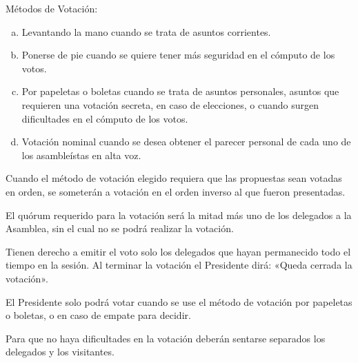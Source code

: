 \article
Métodos de Votación:
\begin{enumerate}[a)]
    \item Levantando la mano cuando se trata de asuntos corrientes.
    \item Ponerse de pie cuando se quiere tener más seguridad en el cómputo de los votos.
    \item Por papeletas o boletas cuando se trata de asuntos personales, asuntos que requieren una votación secreta, en caso de elecciones, o cuando surgen dificultades en el cómputo de los votos.
    \item Votación nominal cuando se desea obtener el parecer personal de cada uno de los asambleístas en alta voz.
\end{enumerate}
Cuando el método de votación elegido requiera que las propuestas sean votadas en orden, se someterán a votación en el orden inverso al que fueron presentadas.

\article
El quórum requerido para la votación será la mitad más uno de los delegados a la Asamblea, sin el cual no se podrá realizar la votación.

\article
Tienen derecho a emitir el voto solo los delegados que hayan permanecido todo el tiempo en la sesión. Al terminar la votación el Presidente dirá: «Queda cerrada la votación».

\article
El Presidente solo podrá votar cuando se use el método de votación por papeletas o boletas, o en caso de empate para decidir.

\article
Para que no haya dificultades en la votación deberán sentarse separados los delegados y los visitantes.

\label{votaciones-final}
